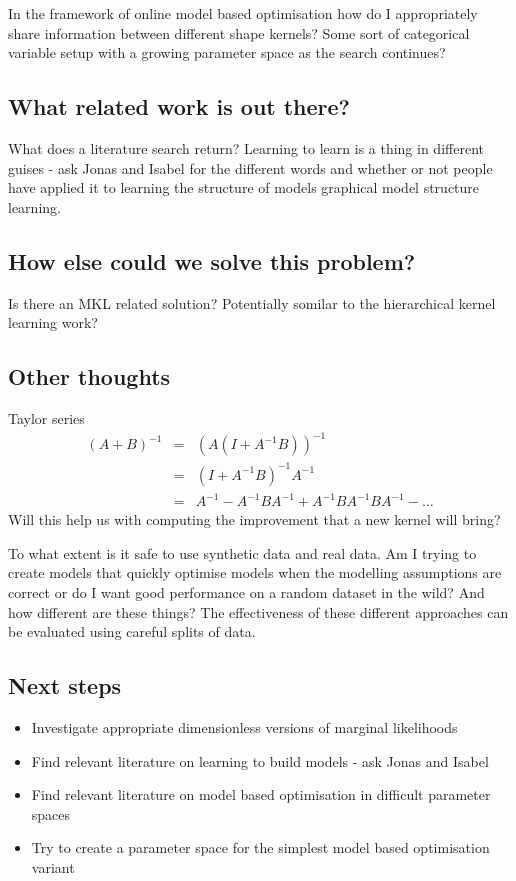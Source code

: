 \documentclass[twoside,11pt]{article}
\begin{document}
In the framework of online model based optimisation how do I appropriately share information between different shape kernels?
Some sort of categorical variable setup with a growing parameter space as the search continues?

\subsection{What related work is out there?}

What does a literature search return?
Learning to learn is a thing in different guises - ask Jonas and Isabel for the different words and whether or not people have applied it to learning the structure of models \eg graphical model structure learning.

\subsection{How else could we solve this problem?}

Is there an MKL related solution?
Potentially somilar to the hierarchical kernel learning work?

\subsection{Other thoughts}

Taylor series \eg
\begin{eqnarray}
  (A+B)^{-1} & = & (A(I+A^{-1}B))^{-1} \\
             & = & (I + A^{-1}B)^{-1}A^{-1} \\
             & = & A^{-1} - A^{-1}BA^{-1} + A^{-1}BA^{-1}BA^{-1} - \dots
\end{eqnarray}
Will this help us with computing the improvement that a new kernel will bring?

To what extent is it safe to use synthetic data and real data.
Am I trying to create models that quickly optimise models when the modelling assumptions are correct or do I want good performance on a random dataset in the wild?
And how different are these things?
The effectiveness of these different approaches can be evaluated using careful splits of data.

\subsection{Next steps}

\begin{itemize}
   \item Investigate appropriate dimensionless versions of marginal likelihoods
   \item Find relevant literature on learning to build models - ask Jonas and Isabel
   \item Find relevant literature on model based optimisation in difficult parameter spaces
   \item Try to create a parameter space for the simplest model based optimisation variant
\end{itemize}
\newpage


\vskip 0.2in

\end{document}
